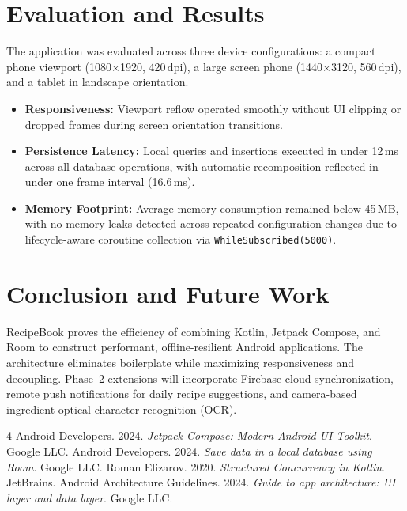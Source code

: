 \documentclass[sigconf]{acmart}
\begin{document}
\section{Evaluation and Results}
The application was evaluated across three device configurations: a compact phone viewport (1080$\times$1920, 420\,dpi), a large screen phone (1440$\times$3120, 560\,dpi), and a tablet in landscape orientation. 

\begin{itemize}
    \item \textbf{Responsiveness:} Viewport reflow operated smoothly without UI clipping or dropped frames during screen orientation transitions.
    \item \textbf{Persistence Latency:} Local queries and insertions executed in under 12\,ms across all database operations, with automatic recomposition reflected in under one frame interval (16.6\,ms).
    \item \textbf{Memory Footprint:} Average memory consumption remained below 45\,MB, with no memory leaks detected across repeated configuration changes due to lifecycle-aware coroutine collection via \texttt{WhileSubscribed(5000)}.
\end{itemize}

\section{Conclusion and Future Work}
RecipeBook proves the efficiency of combining Kotlin, Jetpack Compose, and Room to construct performant, offline-resilient Android applications. The architecture eliminates boilerplate while maximizing responsiveness and decoupling. Phase~2 extensions will incorporate Firebase cloud synchronization, remote push notifications for daily recipe suggestions, and camera-based ingredient optical character recognition (OCR).


\begin{thebibliography}{4}
 Android Developers. 2024. \textit{Jetpack Compose: Modern Android UI Toolkit}. Google LLC.
 Android Developers. 2024. \textit{Save data in a local database using Room}. Google LLC.
 Roman Elizarov. 2020. \textit{Structured Concurrency in Kotlin}. JetBrains.
 Android Architecture Guidelines. 2024. \textit{Guide to app architecture: UI layer and data layer}. Google LLC.
\end{thebibliography}
\end{document}
